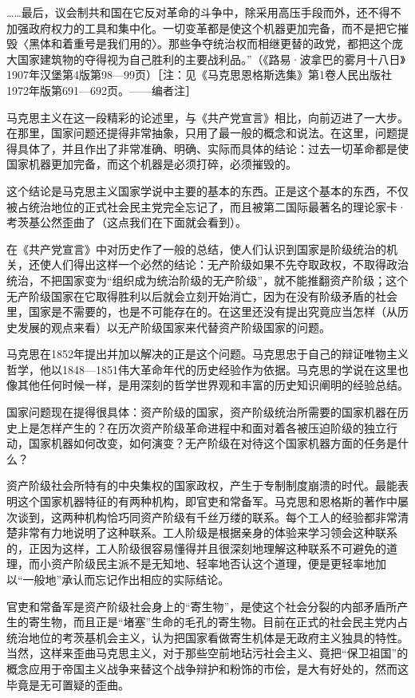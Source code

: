 \documentclass[UTF8, 12pt, a4paper]{ctexrep}
\begin{document}
……最后，议会制共和国在它反对革命的斗争中，除采用高压手段而外，还不得不加强政府权力的工具和集中化。一切变革都是使这个机器更加完备，而不是把它摧毁〈黑体和着重号是我们用的〉。那些争夺统治权而相继更替的政党，都把这个庞大国家建筑物的夺得视为自己胜利的主要战利品。”（《路易·波拿巴的雾月十八日》1907年汉堡第4版第98—99页）［注：见《马克思恩格斯选集》第1卷人民出版社1972年版第691—692页。——编者注］

马克思主义在这一段精彩的论述里，与《共产党宣言》相比，向前迈进了一大步。在那里，国家问题还提得非常抽象，只用了最一般的概念和说法。在这里，问题提得具体了，并且作出了非常准确、明确、实际而具体的结论：过去一切革命都是使国家机器更加完备，而这个机器是必须打碎，必须摧毁的。

这个结论是马克思主义国家学说中主要的基本的东西。正是这个基本的东西，不仅被占统治地位的正式社会民主党完全忘记了，而且被第二国际最著名的理论家卡·考茨基公然歪曲了（这点我们在下面就会看到）。

在《共产党宣言》中对历史作了一般的总结，使人们认识到国家是阶级统治的机关，还使人们得出这样一个必然的结论：无产阶级如果不先夺取政权，不取得政治统治，不把国家变为“组织成为统治阶级的无产阶级”，就不能推翻资产阶级；这个无产阶级国家在它取得胜利以后就会立刻开始消亡，因为在没有阶级矛盾的社会里，国家是不需要的，也是不可能存在的。在这里还没有提出究竟应当怎样（从历史发展的观点来看）以无产阶级国家来代替资产阶级国家的问题。

马克思在1852年提出并加以解决的正是这个问题。马克思忠于自己的辩证唯物主义哲学，他以1848—1851伟大革命年代的历史经验作为依据。马克思的学说在这里也像其他任何时候一样，是用深刻的哲学世界观和丰富的历史知识阐明的经验总结。

国家问题现在提得很具体：资产阶级的国家，资产阶级统治所需要的国家机器在历史上是怎样产生的？在历次资产阶级革命进程中和面对着各被压迫阶级的独立行动，国家机器如何改变，如何演变？无产阶级在对待这个国家机器方面的任务是什么？

资产阶级社会所特有的中央集权的国家政权，产生于专制制度崩溃的时代。最能表明这个国家机器特征的有两种机构，即官吏和常备军。马克思和恩格斯的著作中屡次谈到，这两种机构恰巧同资产阶级有千丝万缕的联系。每个工人的经验都非常清楚非常有力地说明了这种联系。工人阶级是根据亲身的体验来学习领会这种联系的，正因为这样，工人阶级很容易懂得并且很深刻地理解这种联系不可避免的道理，而小资产阶级民主派不是无知地、轻率地否认这个道理，便是更轻率地加以“一般地”承认而忘记作出相应的实际结论。

官吏和常备军是资产阶级社会身上的“寄生物”，是使这个社会分裂的内部矛盾所产生的寄生物，而且正是“堵塞”生命的毛孔的寄生物。目前在正式的社会民主党内占统治地位的考茨基机会主义，认为把国家看做寄生机体是无政府主义独具的特性。当然，这样来歪曲马克思主义，对于那些空前地玷污社会主义、竟把“保卫祖国”的概念应用于帝国主义战争来替这个战争辩护和粉饰的市侩，是大有好处的，然而这毕竟是无可置疑的歪曲。
\end{document}
